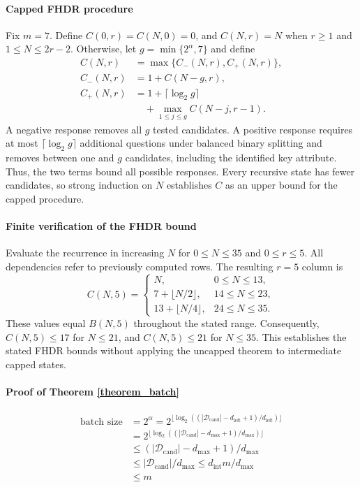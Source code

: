 \documentclass[conference]{IEEEtran}
\theoremstyle{definition}
\theoremstyle{plain}
\begin{document}
\paragraph{Capped FHDR procedure} Fix $m=7$. Define $C(0,r)=C(N,0)=0$, and $C(N,r)=N$ when $r\geq1$ and $1\leq N\leq2r-2$. Otherwise, let $g=\min\{2^\alpha,7\}$ and define
\[
\begin{aligned}
C(N,r)&=\max\{C_-(N,r),C_+(N,r)\},\\
C_-(N,r)&=1+C(N-g,r),\\
C_+(N,r)&=1+\lceil\log_2g\rceil\\
&\quad+\max_{1\leq j\leq g}C(N-j,r-1).
\end{aligned}
\]
A negative response removes all $g$ tested candidates. A positive response requires at most $\lceil\log_2g\rceil$ additional questions under balanced binary splitting and removes between one and $g$ candidates, including the identified key attribute. Thus, the two terms bound all possible responses. Every recursive state has fewer candidates, so strong induction on $N$ establishes $C$ as an upper bound for the capped procedure.

\paragraph{Finite verification of the FHDR bound} Evaluate the recurrence in increasing $N$ for $0\leq N\leq35$ and $0\leq r\leq5$. All dependencies refer to previously computed rows. The resulting $r=5$ column is
\[
C(N,5)=
\begin{cases}
N,&0\leq N\leq13,\\
7+\lfloor N/2\rfloor,&14\leq N\leq23,\\
13+\lfloor N/4\rfloor,&24\leq N\leq35.
\end{cases}
\]
These values equal $B(N,5)$ throughout the stated range. Consequently, $C(N,5)\leq17$ for $N\leq21$, and $C(N,5)\leq21$ for $N\leq35$. This establishes the stated FHDR bounds without applying the uncapped theorem to intermediate capped states.

\paragraph{Proof of Theorem \ref{theorem_batch}}

\begin{equation*}
\begin{aligned}
    \text{batch size}
    &= 2^\alpha = 2^{\lfloor\log_2 ((|\mathcal{D}_\text{cand}|- d_\text{left}+1)/d_\text{left})\rfloor} \\
    &= 2^{\lfloor\log_2 ((|\mathcal{D}_\text{cand}|-d_\text{max}+1)/d_\text{max})\rfloor}\\
    &\leq (|\mathcal{D}_\text{cand}|-d_\text{max}+1)/d_\text{max}\\
    &\leq |\mathcal{D}_\text{cand}|/d_\text{max} \leq d_\text{int}m/d_\text{max}\\
    &\leq m
\end{aligned}
\end{equation*}
\end{document}
